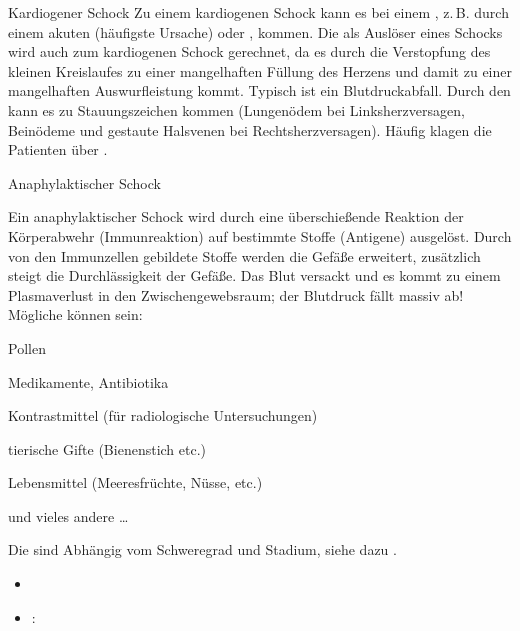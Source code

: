 \TextSlide
{Kardiogener Schock}
{
\label{topic:schock-kardiogener}
Zu einem kardiogenen Schock kann es bei einem , z.\,B. durch einem akuten
 (häufigste Ursache) oder
, kommen. Die  als
Auslöser eines Schocks wird auch zum kardiogenen Schock
gerechnet, da es durch die Verstopfung des kleinen
Kreislaufes zu einer mangelhaften Füllung des Herzens und
damit zu einer mangelhaften Auswurfleistung kommt.
Typisch ist ein Blutdruckabfall. Durch den
 kann es zu Stauungszeichen kommen
(Lungenödem bei Linksherzversagen, Beinödeme und gestaute
Halsvenen bei Rechtsherzversagen). Häufig klagen die
Patienten über .
}
{%
}
{}
{}
{}



\TextSlide
{Anaphylaktischer Schock}
{\label{topic:schock-anaphylaktischer}
Ein anaphylaktischer Schock wird durch eine
über\-schieß\-ende Reaktion der Körperabwehr (Immunreaktion)
auf bestimmte Stoffe (Antigene) ausgelöst.
Durch von den Immunzellen gebildete Stoffe werden
die Gefäße erweitert, zusätzlich steigt die
Durchlässigkeit der Gefäße.
Das Blut versackt und es kommt zu einem  Plasmaverlust in
den Zwischengewebsraum; der
Blutdruck fällt massiv ab!
Mögliche  können sein: 
\begin{compactitem}
    \item Pollen
    \item Medikamente, Antibiotika
    \item Kontrastmittel (für radiologische Untersuchungen)
    \item tierische Gifte (Bienenstich etc.)
    \item Lebensmittel (Meeresfrüchte, Nüsse, etc.)
    \item und vieles andere \ldots
\end{compactitem}

Die {\TxSymptome} sind Abhängig vom Schweregrad und Stadium,
siehe dazu .
}
{%
\begin{itemize}
  \item {}
\item {\TxSymptome}: 
\end{itemize}
}
{}
{}
{}




